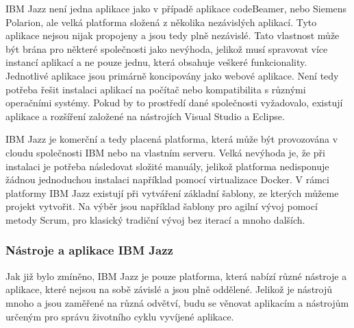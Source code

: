 \documentclass[czech,master,public,dept460,male,cpdeclaration,oneside]{diploma}
\begin{document}
IBM Jazz není jedna aplikace jako v případě aplikace codeBeamer, nebo Siemens Polarion, ale velká platforma složená z několika nezávislých aplikací. Tyto aplikace nejsou nijak propojeny a jsou tedy plně nezávislé. Tato vlastnost může být brána pro některé společnosti jako nevýhoda, jelikož musí spravovat více instancí aplikací a ne pouze jednu, která obsahuje veškeré funkcionality. Jednotlivé aplikace jsou primárně koncipovány jako webové aplikace. Není tedy potřeba řešit instalaci aplikací na počítač nebo kompatibilita s různými operačními systémy. Pokud by to prostředí dané společnosti vyžadovalo, existují aplikace a rozšíření založené na nástrojích Visual Studio a Eclipse.

IBM Jazz je komerční a tedy placená platforma, která může být provozována v cloudu společnosti IBM nebo na vlastním serveru. Velká nevýhoda je, že při instalaci je potřeba následovat složité manuály, jelikož platforma nedisponuje žádnou jednoduchou instalaci například pomocí virtualizace Docker. V rámci platformy IBM Jazz existují při vytváření základní šablony, ze kterých můžeme projekt vytvořit.  Na výběr jsou například šablony pro agilní vývoj pomocí metody Scrum, pro klasický tradiční vývoj bez iterací a mnoho dalších. 


\subsubsection{Nástroje a aplikace IBM Jazz}
Jak již bylo zmíněno, IBM Jazz je pouze platforma, která nabízí různé nástroje a aplikace, které nejsou na sobě závislé a jsou plně oddělené. Jelikož je nástrojů mnoho a jsou zaměřené na různá odvětví, budu se věnovat aplikacím a nástrojům určeným pro správu životního cyklu vyvíjené aplikace. \cite{ref:jazz_products}
\end{document}
